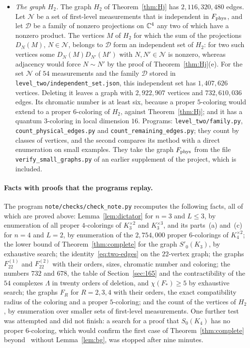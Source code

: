 \begin{itemize}
\item[(C4)] \emph{The graph $H_2$.} The graph $H_2$ of Theorem~\ref{thm:Hj} has $2{,}116{,}320{,}480$ edges. Let $\mathcal N$ be a set of first-level measurements that is independent in $F_{\rm phys}$, and let $\mathcal D$ be a family of nonzero projections on $\mathbb C^4$ any two of which have a nonzero product. The vertices $M$ of $H_2$ for which the sum of the projections $D_N(M)$, $N\in\mathcal N$, belongs to $\mathcal D$ form an independent set of $H_2$: for two such vertices some $D_N(M)D_{N'}(M')$ with $N,N'\in\mathcal N$ is nonzero, whereas adjacency would force $N\sim N'$ by the proof of Theorem~\ref{thm:Hj}(e). For the set $\mathcal N$ of $54$ measurements and the family $\mathcal D$ stored in \texttt{level\_two/independent\_set.json}, this independent set has $1{,}407{,}626$ vertices. Deleting it leaves a graph with $2{,}922{,}907$ vertices and $732{,}610{,}036$ edges. Its chromatic number is at least six, because a proper $5$-coloring would extend to a proper $6$-coloring of $H_2$, against Theorem~\ref{thm:Hj}; and it has a quantum $3$-coloring in local dimension $16$. Programs: \texttt{level\_two/family.py}, \texttt{count\_physical\_edges.py} and \texttt{count\_remaining\_edges.py}; they count by classes of vertices, and the second compares its method with a direct enumeration on small examples. They take the graph $F_{\rm phys}$ from the file \texttt{verify\_small\_graphs.py} of an earlier supplement of the project, which is included.
\end{itemize}

\paragraph{Facts with proofs that the programs replay.}
The program \texttt{note/checks/check\_note.py} recomputes the following facts, all of which are proved above: Lemma~\ref{lem:dictator} for $n=3$ and $L\le3$, by enumeration of all proper $4$-colorings of $K_3^{\times2}$ and $K_3^{\times3}$, and its parts~(a) and~(c) for $n=4$ and $L=2$, by enumeration of the $2{,}754{,}000$ proper $6$-colorings of $K_4^{\times2}$; the lower bound of Theorem~\ref{thm:complete} for the graph $S'_0(K_3)$, by exhaustive search; the identity~\eqref{eq:two-edges} on the $22$-vertex graph; the graphs $F_{22}^{(1)}$ and $F_{22}^{(2)}$ with their orders, sizes, chromatic number and coloring; the numbers $732$ and $678$, the table of Section~\ref{sec:165} and the contractibility of the $54$ complexes $\Lambda$ in twenty orders of deletion, and $\chi(F_*)\ge5$ by exhaustive search; the graphs $F_R$ for $R=2,3,4$ with their orders, the exact compatibility radius of the coloring and a proper $5$-coloring; and the count of the vertices of $H_2$, by enumeration over smaller sets of first-level measurements. One further test was attempted and did not finish: a search for a proof that $S_0(K_4)$ has no proper $6$-coloring, which would confirm the first case of Theorem~\ref{thm:complete} beyond~\cite{Z} without Lemma~\ref{lem:bg}, was stopped after nine minutes.
